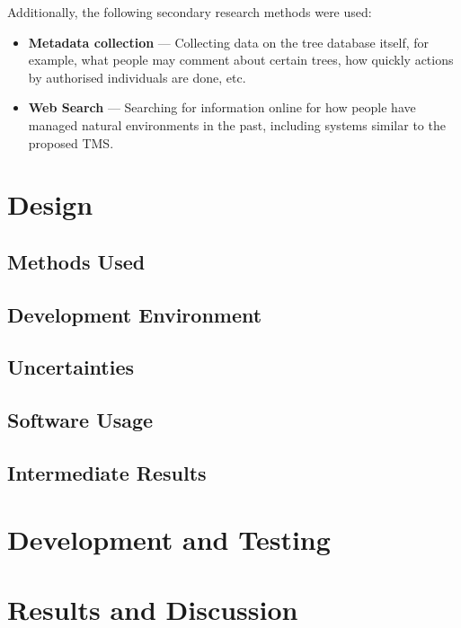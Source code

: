 \documentclass[12pt]{report}
\begin{document}
Additionally, the following secondary research methods were used:

\begin{itemize}
    \item \textbf{Metadata collection} --- Collecting data on the tree database
    itself, for example, what people may comment about certain trees, how
    quickly actions by authorised individuals are done, etc.
    \item \textbf{Web Search} --- Searching for information online for how
    people have managed natural environments in the past, including systems
    similar to the proposed TMS.\
\end{itemize}

\section{Design}

\subsection{Methods Used}



\subsection{Development Environment}

\subsection{Uncertainties}

\subsection{Software Usage}

\subsection{Intermediate Results}

\section{Development and Testing}

\section{Results and Discussion}
\end{document}
